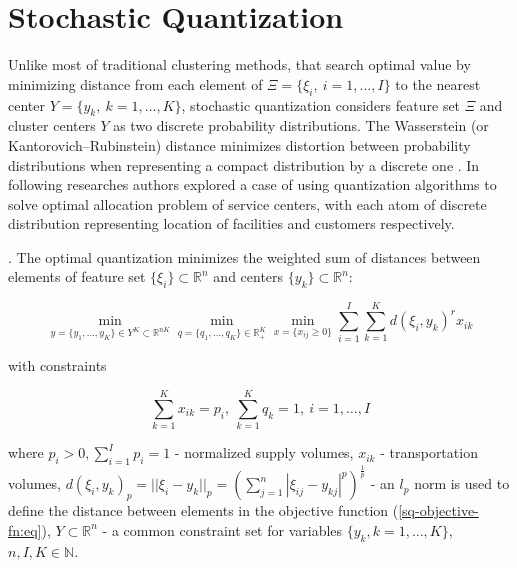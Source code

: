 \section{Stochastic Quantization}

Unlike most of traditional clustering methods, that search optimal value by minimizing distance from each element of $ \Xi = \{ \xi_i, \> i = 1, \ldots, I \} $ to the nearest center $ Y = \{ y_k, \> k = 1, \ldots, K \} $, stochastic quantization considers feature set $ \Xi $ and cluster centers $ Y $ as two discrete probability distributions. The Wasserstein (or Kantorovich–Rubinstein) distance minimizes distortion between probability distributions when representing a compact distribution by a discrete one \cite{Kuzmenko_Uryasev_2019,Lakshmanan_Pichler_2023}. In following researches \cite{Kuzmenko_Uryasev_2019,Norkin_Onishchenko_2005} authors explored a case of using quantization algorithms to solve optimal allocation problem of service centers, with each atom of discrete distribution representing location of facilities and customers respectively.

\begin{definition}
    \label{Stochastic Quantization} \cite{Kuzmenko_Uryasev_2019}. The optimal quantization minimizes the weighted sum of distances between elements of feature set $ \{ \xi_i \} \subset \mathbb{R}^{n} $ and centers $ \{ y_k \} \subset \mathbb{R}^{n} $:

    \begin{equation}
        \label{sq-objective-fn:eq}
            \min_{y = \{ y_1, \ldots, y_K \} \in Y^K \subset \mathbb{R}^{nK}} \min_{q = \{ q_1, \ldots, q_K \} \in \mathbb{R}^K_{+}} \min_{x = \{ x_{ij} \geq 0 \}} \sum_{i=1}^I \sum_{k=1}^K d(\xi_i, y_k)^r x_{ik}
    \end{equation}

    with constraints

    \begin{equation}
        \label{sq-objective-constraints:eq}
            \sum_{k=1}^K x_{ik} = p_i, \> \sum_{k=1}^K q_k = 1, \> i = 1, \ldots, I
    \end{equation}

    \noindent where $ p_i > 0, \sum_{i=1}^I p_i = 1 $ - normalized supply volumes, $ x_{ik} $ - transportation volumes, $ d(\xi_i, y_k)_p = || \xi_i - y_k ||_p = (\sum_{j=1}^n | \xi_{ij} - y_{kj} |^p)^{\frac{1}{p}} $ - an $ l_p $ norm is used to define the distance between elements in the objective function (\ref{sq-objective-fn:eq}), $ Y \subset \mathbb{R}^{n} $ - a common constraint set for variables $ \{ y_k, k = 1, \ldots, K \} $, $ n, I, K \in \mathbb{N} $.
\end{definition}

